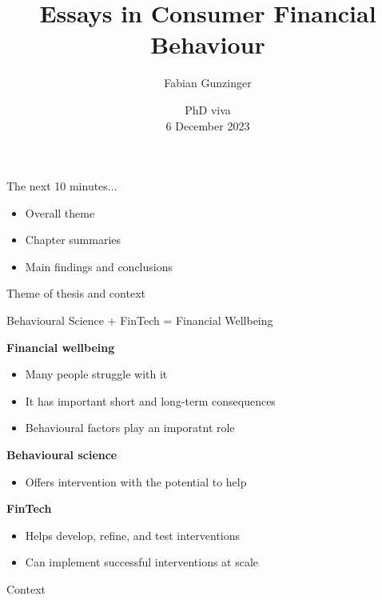 \documentclass[xcolor=svgnames]{beamer}
\title{Essays in Consumer Financial Behaviour}
\author{Fabian Gunzinger \inst{1}}
\institute
{
    \inst{1}%
    University of Warwick\\
    \url{fabian.gunzinger@warwick.ac.uk}
}
\date {PhD viva \\ \vspace{1mm} 6 December 2023}
\begin{document}
\begin{frame}
  \titlepage
\end{frame}

\begin{frame}{The next 10 minutes...}
    \begin{itemize}
        \item Overall theme
        \item Chapter summaries
        \item Main findings and conclusions
    \end{itemize}
\end{frame}

\begin{frame}{Theme of thesis and context}

    Behavioural Science + FinTech = Financial Wellbeing

    \vspace{1cm}

    \textbf{Financial wellbeing}
    \begin{itemize}
        \item Many people struggle with it
        \item It has important short and long-term consequences
        \item Behavioural factors play an imporatnt role
    \end{itemize}
    \textbf{Behavioural science}
    \begin{itemize}
        \item Offers intervention with the potential to help
    \end{itemize}    
    \textbf{FinTech}
    \begin{itemize}
        \item Helps develop, refine, and test interventions
        \item Can implement successful interventions at scale
    \end{itemize}
\end{frame}

\begin{frame}{Context}

\end{frame}
\end{document}
